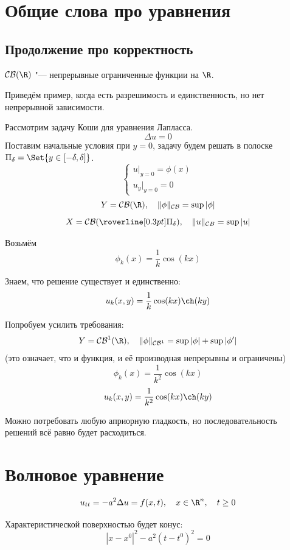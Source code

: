 \chapter{Общие слова про уравнения}

\section{Продолжение про корректность}

\begin{notation}
	$ \mathcal{CB}(\R) $ "--- непрерывные ограниченные функции на $ \R $.
\end{notation}

\begin{eg}[Ж. Адамар]
	Приведём пример, когда есть разрешимость и единственность, но нет непрерывной зависимости.

	Рассмотрим задачу Коши для уравнения Лапласса.
	$$ \Delta u = 0 $$
	Поставим начальные условия при $ y = 0 $, задачу будем решать в полоске $ \Pi_\delta =
	\Set{y \in [-\delta, \delta]} $.
	$$
	\begin{cases}
		u\bigr|_{y = 0} = \phi(x) \\
		u_y \bigr|_{y = 0} = 0
	\end{cases} $$
	$$ Y = \mathcal{CB}(\R), \quad \|\phi\|_{\mathcal{CB}} = \sup|\phi| $$
	$$ X = \mathcal{CB}(\roverline[0.3pt] \Pi_\delta), \quad \|u\|_{\mathcal CB} = \sup|u| $$

	Возьмём
	$$ \phi_k(x) = \frac1k \cos(kx) $$

	Знаем, что решение существует и единственно:
	$$ u_k(x, y) = \frac1k \cos(kx) \ch(ky) $$

	Попробуем усилить требования:
	$$ Y = \mathcal{CB}^1(\R), \quad \|\phi\|_{\mathcal{CB}^1} = \sup|\phi| + \sup|\phi'| $$
	(это означает, что и функция, и её производная непрерывны и ограничены)
	$$ \phi_k(x) = \frac1{k^2} \cos(kx) $$
	$$ u_k(x, y) = \frac1{k^2} \cos(kx) \ch(ky) $$

	Можно потребовать любую априорную гладкость, но последовательность решений всё равно будет
	расходиться.
\end{eg}

\chapter{Волновое уравнение}

$$ u_{tt} = -a^2 \Delta u = f(x, t), \quad x \in \R^n, \quad t \ge 0 $$

Характеристической поверхностью будет конус:
$$ |x - x^0|^2 - a^2 (t - t^0)^2 = 0 $$


